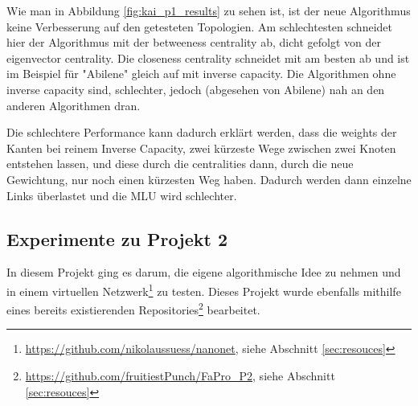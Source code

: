 \documentclass[sigconf, nonacm, review]{acmart}
\begin{document}
Wie man in Abbildung \ref{fig:kai_p1_results} zu sehen ist, ist der neue Algorithmus keine Verbesserung auf den getesteten Topologien.
Am schlechtesten schneidet hier der Algorithmus mit der betweeness centrality ab, dicht gefolgt von der eigenvector centrality.
Die closeness centrality schneidet mit am besten ab und ist im Beispiel für "Abilene" gleich auf mit inverse capacity.
Die Algorithmen ohne inverse capacity sind, schlechter, jedoch (abgesehen von Abilene) nah an den anderen Algorithmen dran.

Die schlechtere Performance kann dadurch erklärt werden, dass die weights der Kanten bei reinem Inverse Capacity, zwei kürzeste Wege zwischen zwei Knoten entstehen lassen, und diese durch die centralities dann, durch die neue Gewichtung, nur noch einen kürzesten Weg haben.
Dadurch werden dann einzelne Links überlastet und die MLU wird schlechter.
\subsection{Experimente zu Projekt 2}
In diesem Projekt ging es darum, die eigene algorithmische Idee zu nehmen und in einem virtuellen Netzwerk\footnote{\url{https://github.com/nikolaussuess/nanonet}, siehe Abschnitt \ref{sec:resouces}} zu testen. 
Dieses Projekt wurde ebenfalls mithilfe eines bereits existierenden Repositories\footnote{\url{https://github.com/fruitiestPunch/FaPro_P2}, siehe Abschnitt \ref{sec:resouces}} bearbeitet.
\end{document}
